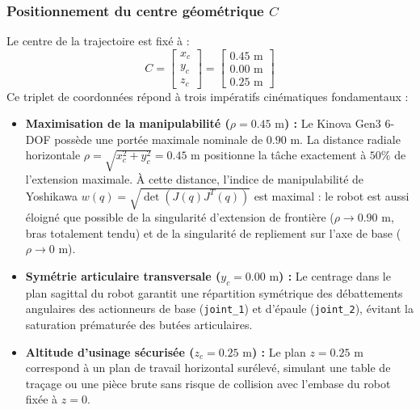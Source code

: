 \documentclass[11pt,a4paper]{report}
\begin{document}
\subsubsection{Positionnement du centre géométrique $C$}
Le centre de la trajectoire est fixé à :
\begin{equation}
    C = \begin{bmatrix} x_c \\ y_c \\ z_c \end{bmatrix} = \begin{bmatrix} 0.45\text{ m} \\ 0.00\text{ m} \\ 0.25\text{ m} \end{bmatrix}
\end{equation}
Ce triplet de coordonnées répond à trois impératifs cinématiques fondamentaux :
\begin{itemize}
    \item \textbf{Maximisation de la manipulabilité ($\rho = 0.45\text{ m}$) :} Le Kinova Gen3 6-DOF possède une portée maximale nominale de $0.90\text{ m}$. La distance radiale horizontale $\rho = \sqrt{x_c^2 + y_c^2} = 0.45\text{ m}$ positionne la tâche exactement à $50\%$ de l'extension maximale. À cette distance, l'indice de manipulabilité de Yoshikawa $w(q) = \sqrt{\det(J(q)J^T(q))}$ est maximal : le robot est aussi éloigné que possible de la singularité d'extension de frontière ($\rho \to 0.90\text{ m}$, bras totalement tendu) et de la singularité de repliement sur l'axe de base ($\rho \to 0\text{ m}$).
    \item \textbf{Symétrie articulaire transversale ($y_c = 0.00\text{ m}$) :} Le centrage dans le plan sagittal du robot garantit une répartition symétrique des débattements angulaires des actionneurs de base (\texttt{joint\_1}) et d'épaule (\texttt{joint\_2}), évitant la saturation prématurée des butées articulaires.
    \item \textbf{Altitude d'usinage sécurisée ($z_c = 0.25\text{ m}$) :} Le plan $z = 0.25\text{ m}$ correspond à un plan de travail horizontal surélevé, simulant une table de traçage ou une pièce brute sans risque de collision avec l'embase du robot fixée à $z=0$.
\end{itemize}
\end{document}
